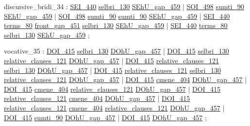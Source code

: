 \label{html:y34}
discursive_bridi_34     :  \hyperref[html:y440]{SEI_440}  \hyperref[html:y130]{selbri_130}  \hyperref[html:y459]{SEhU_gap_459}
                        |  \hyperref[html:y498]{SOI_498}  \hyperref[html:y90]{sumti_90}  \hyperref[html:y459]{SEhU_gap_459}
                        |  \hyperref[html:y498]{SOI_498}  \hyperref[html:y90]{sumti_90}  \hyperref[html:y90]{sumti_90}  \hyperref[html:y459]{SEhU_gap_459}
                        |  \hyperref[html:y440]{SEI_440}  \hyperref[html:y80]{terms_80}  \hyperref[html:y451]{front_gap_451}
                                  \hyperref[html:y130]{selbri_130}  \hyperref[html:y459]{SEhU_gap_459}
                        |  \hyperref[html:y440]{SEI_440}  \hyperref[html:y80]{terms_80}  \hyperref[html:y130]{selbri_130}  \hyperref[html:y459]{SEhU_gap_459}
                        ;

\label{html:y35}
vocative_35             :  \hyperref[html:y415]{DOI_415}  \hyperref[html:y130]{selbri_130}  \hyperref[html:y457]{DOhU_gap_457}
                        |  \hyperref[html:y415]{DOI_415}  \hyperref[html:y130]{selbri_130}
                                  \hyperref[html:y121]{relative_clauses_121}  \hyperref[html:y457]{DOhU_gap_457}
                        |  \hyperref[html:y415]{DOI_415}  \hyperref[html:y121]{relative_clauses_121}
                                  \hyperref[html:y130]{selbri_130}  \hyperref[html:y457]{DOhU_gap_457}
                        |  \hyperref[html:y415]{DOI_415}  \hyperref[html:y121]{relative_clauses_121}
                                  \hyperref[html:y130]{selbri_130}  \hyperref[html:y121]{relative_clauses_121}  \hyperref[html:y457]{DOhU_gap_457}
                        |  \hyperref[html:y415]{DOI_415}  \hyperref[html:y404]{cmene_404}  \hyperref[html:y457]{DOhU_gap_457}
                        |  \hyperref[html:y415]{DOI_415}  \hyperref[html:y404]{cmene_404}
                                  \hyperref[html:y121]{relative_clauses_121}  \hyperref[html:y457]{DOhU_gap_457}
                        |  \hyperref[html:y415]{DOI_415}  \hyperref[html:y121]{relative_clauses_121}  \hyperref[html:y404]{cmene_404}
                                 \hyperref[html:y457]{DOhU_gap_457}
                        |  \hyperref[html:y415]{DOI_415}  \hyperref[html:y121]{relative_clauses_121}  \hyperref[html:y404]{cmene_404}
                                  \hyperref[html:y121]{relative_clauses_121}  \hyperref[html:y457]{DOhU_gap_457}
                        |  \hyperref[html:y415]{DOI_415}  \hyperref[html:y90]{sumti_90}  \hyperref[html:y457]{DOhU_gap_457}
                        |  \hyperref[html:y415]{DOI_415}  \hyperref[html:y457]{DOhU_gap_457}
                        ;

